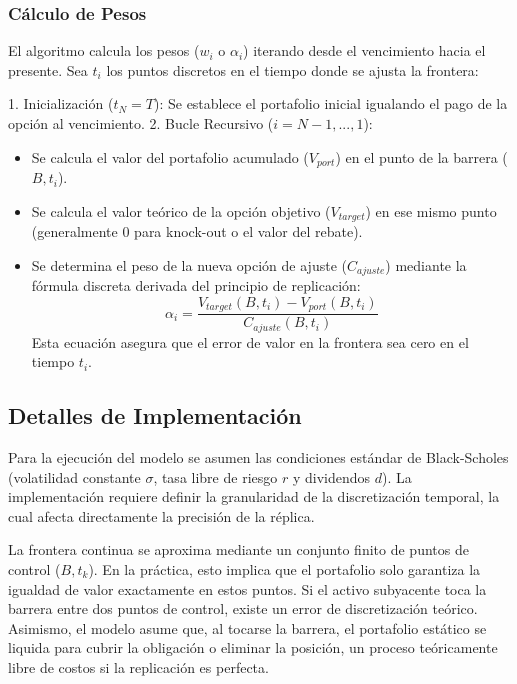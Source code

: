 \subsubsection*{Cálculo de Pesos} 

El algoritmo calcula los pesos ($w_i$ o $\alpha_i$) iterando desde el vencimiento hacia el presente. Sea $t_i$ los puntos discretos en el tiempo donde se ajusta la frontera:

  1. Inicialización ($t_N=T$): Se establece el portafolio inicial igualando el pago de la opción al vencimiento.
  2. Bucle Recursivo ($i=N-1,...,1$): 
    \begin{itemize} 
      \item Se calcula el valor del portafolio acumulado ($V_{port}$) en el punto de la barrera ($B,t_i$).
      
      \item Se calcula el valor teórico de la opción objetivo ($V_{target}$) en ese mismo punto (generalmente $0$ para knock-out o el valor del rebate).
      
      \item Se determina el peso de la nueva opción de ajuste ($C_{ajuste}$) mediante la fórmula discreta derivada del principio de replicación:
        \begin{equation} 
          \alpha_i = \frac{V_{target}(B, t_i) - V_{port}(B, t_i)}{C_{ajuste}(B, t_i)} 
        \end{equation} 
        Esta ecuación asegura que el error de valor en la frontera sea cero en el tiempo $t_i$. 
    \end{itemize}

\subsection{Detalles de Implementación}

Para la ejecución del modelo se asumen las condiciones estándar de Black-Scholes (volatilidad constante $\sigma$, tasa libre de riesgo $r$ y dividendos $d$). La implementación requiere definir la granularidad de la discretización temporal, la cual afecta directamente la precisión de la réplica.

La frontera continua se aproxima mediante un conjunto finito de puntos de control ($B,t_k$). En la práctica, esto implica que el portafolio solo garantiza la igualdad de valor exactamente en estos puntos. Si el activo subyacente toca la barrera entre dos puntos de control, existe un error de discretización teórico. Asimismo, el modelo asume que, al tocarse la barrera, el portafolio estático se liquida para cubrir la obligación o eliminar la posición, un proceso teóricamente libre de costos si la replicación es perfecta.

